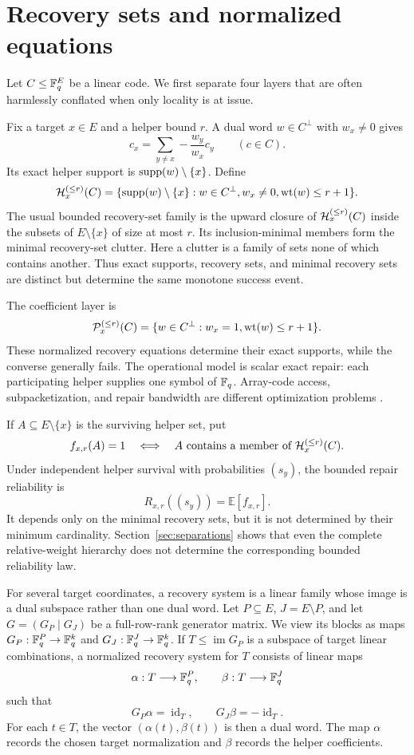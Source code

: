 \section{Recovery sets and normalized equations}
\label{sec:recovery-equations}

Let $C\leq\mathbb F_q^E$ be a linear code.  We first separate four layers that are
often harmlessly conflated when only locality is at issue.

Fix a target $x\in E$ and a helper bound $r$.  A dual word $w\in C^\perp$
with $w_x\ne0$ gives
\[
 c_x=\sum_{y\ne x}-\frac{w_y}{w_x}c_y
 \qquad(c\in C).
\]
Its exact helper support is $\operatorname{supp}(w)\setminus\{x\}$.  Define
\[
 \mathcal H_x^{(\le r)}(C)=
 \{\operatorname{supp}(w)\setminus\{x\}:w\in C^\perp, w_x\ne0,
       \operatorname{wt}(w)\le r+1\}.
\]
The usual bounded recovery-set family is the upward closure of
$\mathcal H_x^{(\le r)}(C)$ inside the subsets of $E\setminus\{x\}$ of size at most
$r$.  Its inclusion-minimal members form the minimal recovery-set clutter.
Here a clutter is a family of sets none of which contains another.
Thus exact supports, recovery sets, and minimal recovery sets are distinct
but determine the same monotone success event.

The coefficient layer is
\[
 \mathcal P_x^{(\le r)}(C)=
 \{w\in C^\perp:w_x=1, \operatorname{wt}(w)\le r+1\}.
\]
These normalized recovery equations determine their exact supports, while
the converse generally fails.  The operational model is scalar exact repair:
each participating helper supplies one symbol of $\mathbb F_q$.  Array-code access,
subpacketization, and repair bandwidth are different optimization problems
\cite{ShahEtAl2010,YeBarg2016,GuruswamiWootters2016,MatthewsEtAl2026}.

If $A\subseteq E\setminus\{x\}$ is the surviving helper set, put
\[
 f_{x,r}(A)=1
 \quad\Longleftrightarrow\quad
 \text{$A$ contains a member of $\mathcal H_x^{(\le r)}(C)$}.
\]
Under independent helper survival with probabilities $(s_y)$, the bounded
repair reliability is
\[
 R_{x,r}((s_y))=\mathbb E[f_{x,r}].
\]
It depends only on the minimal recovery sets, but it is not determined by
their minimum cardinality.  Section~\ref{sec:separations} shows that even the
complete relative-weight hierarchy does not determine the corresponding
bounded reliability law.

For several target coordinates, a recovery system is a linear family whose
image is a dual subspace rather than one dual word.  Let $P\subseteq E$,
$J=E\setminus P$, and let
$G=(G_P\mid G_J)$ be a full-row-rank generator matrix.  We view its blocks as
maps $G_P:\mathbb F_q^P\to\mathbb F_q^k$ and $G_J:\mathbb F_q^J\to\mathbb F_q^k$.  If
$T\leq\operatorname{im}G_P$ is a subspace of target linear combinations, a
normalized recovery system for $T$ consists of linear maps
\[
 \alpha:T\longrightarrow\mathbb F_q^P,
 \qquad
 \beta:T\longrightarrow\mathbb F_q^J
\]
such that
\[
 G_P\alpha=\operatorname{id}_T,
 \qquad
 G_J\beta=-\operatorname{id}_T.
\]
For each $t\in T$, the vector $(\alpha(t),\beta(t))$ is then a dual word.
The map $\alpha$ records the chosen target normalization and $\beta$ records
the helper coefficients.

